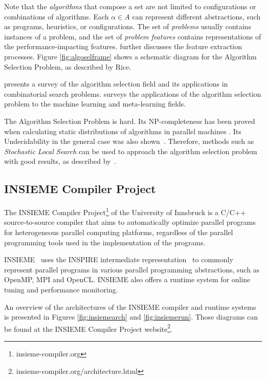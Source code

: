 \documentclass[a4paper, 12pt]{article}
\begin{document}
Note that the \emph{algorithms} that compose a set are not limited to
configurations or combinations of algorithms. Each $\alpha \in A$ can represent
different abstractions, such as programs, heuristics, or configurations. The
set of \emph{problems} usually contains instances of a problem, and the set of
\emph{problem features} contains representations of the performance-impacting
features. \citet{ding2014autotuning} further discusses the feature extraction
processes.  Figure \ref{fig:algoselframe} shows a schematic diagram for the
Algorithm Selection Problem, as described by Rice.

\citet{kotthoff2012algorithm} presents a survey of the algorithm selection
field and its applications in combinatorial search problems.
\citet{smith2008cross} surveys the applications of the algorithm selection
problem to the machine learning and meta-learning fields.

The Algorithm Selection Problem is hard. Its NP-completeness has been proved
when calculating static distributions of algorithms in parallel machines
\cite{bougeret2009combining}. Its Undecidability in the general case was also
shown~\cite{guo2003algorithm}. Therefore, methods such as \emph{Stochastic
Local Search} can be used to approach the algorithm selection problem with good
results, as described by~\citet{hutter2009paramils}.

\subsection{INSIEME Compiler Project} \label{sec:insieme}

The INSIEME Compiler Project\footnote{insieme-compiler.org} of the University 
of Innsbruck is a C/C++ source-to-source compiler that aims to automatically 
optimize parallel programs for heterogeneous parallel computing platforms, 
regardless of the parallel programming tools used in the implementation of 
the programs.

INSIEME~\cite{jordan2012multi} uses the INSPIRE intermediate
representation~\cite{jordan2013inspire} to commonly represent
parallel programs in various parallel programming abstractions,
such as OpenMP, MPI and OpenCL. INSIEME also offers a runtime
system for online tuning and performance monitoring.

An overview of the architectures of the INSIEME compiler and runtime
systems is presented in Figures \ref{fig:insiemearch} and \ref{fig:insiemerun}.
Those diagrams can be found at the INSIEME Compiler Project 
website\footnote{insieme-compiler.org/architecture.html}.
\end{document}
